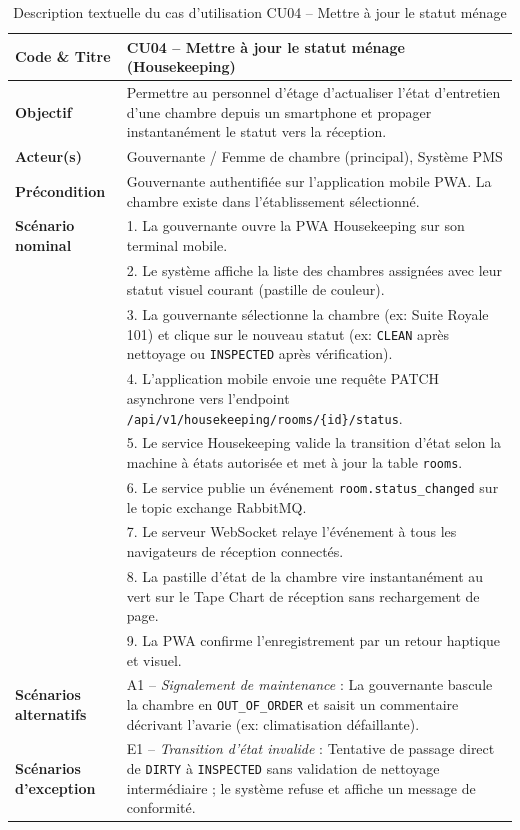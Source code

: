 \begin{table}[H]
\centering
\small
\renewcommand{\arraystretch}{1.2}
\begin{tabularx}{\textwidth}{|p{3.5cm}|X|}
\hline
\textbf{Code \& Titre} & \textbf{CU04 -- Mettre à jour le statut ménage (Housekeeping)} \\
\hline
\textbf{Objectif} & Permettre au personnel d'étage d'actualiser l'état d'entretien d'une chambre depuis un smartphone et propager instantanément le statut vers la réception. \\
\hline
\textbf{Acteur(s)} & Gouvernante / Femme de chambre (principal), Système PMS \\
\hline
\textbf{Précondition} & Gouvernante authentifiée sur l'application mobile PWA. La chambre existe dans l'établissement sélectionné. \\
\hline
\textbf{Scénario nominal} & 
1. La gouvernante ouvre la PWA Housekeeping sur son terminal mobile.\\
& 2. Le système affiche la liste des chambres assignées avec leur statut visuel courant (pastille de couleur).\\
& 3. La gouvernante sélectionne la chambre (ex: Suite Royale 101) et clique sur le nouveau statut (ex: \texttt{CLEAN} après nettoyage ou \texttt{INSPECTED} après vérification).\\
& 4. L'application mobile envoie une requête PATCH asynchrone vers l'endpoint \texttt{/api/v1/housekeeping/rooms/\{id\}/status}.\\
& 5. Le service Housekeeping valide la transition d'état selon la machine à états autorisée et met à jour la table \texttt{rooms}.\\
& 6. Le service publie un événement \texttt{room.status\_changed} sur le topic exchange RabbitMQ.\\
& 7. Le serveur WebSocket relaye l'événement à tous les navigateurs de réception connectés.\\
& 8. La pastille d'état de la chambre vire instantanément au vert sur le Tape Chart de réception sans rechargement de page.\\
& 9. La PWA confirme l'enregistrement par un retour haptique et visuel.\\
\hline
\textbf{Scénarios alternatifs} & 
A1 -- \textit{Signalement de maintenance} : La gouvernante bascule la chambre en \texttt{OUT\_OF\_ORDER} et saisit un commentaire décrivant l'avarie (ex: climatisation défaillante).\\
\hline
\textbf{Scénarios d'exception} & 
E1 -- \textit{Transition d'état invalide} : Tentative de passage direct de \texttt{DIRTY} à \texttt{INSPECTED} sans validation de nettoyage intermédiaire ; le système refuse et affiche un message de conformité.\\
\hline
\end{tabularx}
\caption{Description textuelle du cas d'utilisation CU04 -- Mettre à jour le statut ménage}
\label{tab:uc_cu04}
\end{table}

